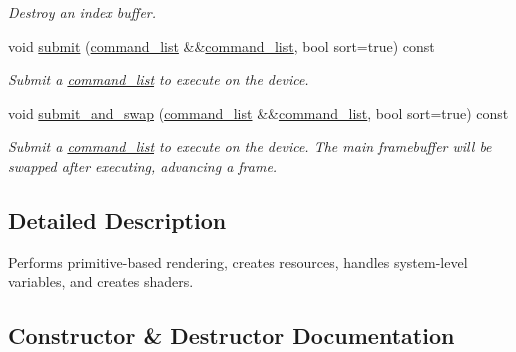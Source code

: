 \begin{DoxyCompactItemize}
$$\begin{DoxyCompactList}\small\item\em Destroy an index buffer. \end{DoxyCompactList}\item 
void \mbox{\hyperlink{classmoka_1_1graphics__device_a94137d1281fbe4df827eb01ee37b4ecc}{submit}} (\mbox{\hyperlink{classmoka_1_1command__list}{command\+\_\+list}} \&\&\mbox{\hyperlink{classmoka_1_1command__list}{command\+\_\+list}}, bool sort=true) const
\begin{DoxyCompactList}\small\item\em Submit a \mbox{\hyperlink{classmoka_1_1command__list}{command\+\_\+list}} to execute on the device. \end{DoxyCompactList}\item 
void \mbox{\hyperlink{classmoka_1_1graphics__device_abc73cf8ee1bca348119cd96c1713edd0}{submit\+\_\+and\+\_\+swap}} (\mbox{\hyperlink{classmoka_1_1command__list}{command\+\_\+list}} \&\&\mbox{\hyperlink{classmoka_1_1command__list}{command\+\_\+list}}, bool sort=true) const
\begin{DoxyCompactList}\small\item\em Submit a \mbox{\hyperlink{classmoka_1_1command__list}{command\+\_\+list}} to execute on the device. The main framebuffer will be swapped after executing, advancing a frame. \end{DoxyCompactList}\end{DoxyCompactItemize}


\subsection{Detailed Description}
Performs primitive-\/based rendering, creates resources, handles system-\/level variables, and creates shaders. 

\subsection{Constructor \& Destructor Documentation}
\mbox{\label{classmoka_1_1graphics__device_aa2e8bc278a52e16d3c5b887f67496236}} 
